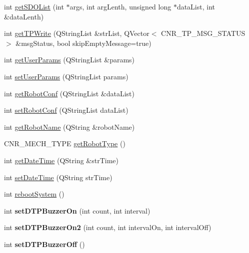 \begin{DoxyCompactItemize}
\item 
int \hyperlink{classCUIApp_af91843d583fe4bd9b12abf1ea1d04bea}{get\-S\-D\-O\-List} (int $\ast$args, int arg\-Lenth, unsigned long $\ast$data\-List, int \&data\-Lenth)
\item 
int \hyperlink{classCUIApp_a9e407fdd117152f6e43e5e6ab5fcb9a6}{get\-T\-P\-Write} (Q\-String\-List \&str\-List, Q\-Vector$<$ C\-N\-R\-\_\-\-T\-P\-\_\-\-M\-S\-G\-\_\-\-S\-T\-A\-T\-U\-S $>$ \&msg\-Status, bool skip\-Empty\-Message=true)
\item 
int \hyperlink{classCUIApp_af65c69d76062c8c0b9eded1761c1e7e9}{get\-User\-Params} (Q\-String\-List \&params)
\item 
int \hyperlink{classCUIApp_a8e509954cca273e527eafc4fde64a0b2}{set\-User\-Params} (Q\-String\-List params)
\item 
int \hyperlink{classCUIApp_a674f263816eeb0bdb7b68439f421260a}{get\-Robot\-Conf} (Q\-String\-List \&data\-List)
\item 
int \hyperlink{classCUIApp_a72fc3d4ed526cc68125ad588f67b5425}{set\-Robot\-Conf} (Q\-String\-List data\-List)
\item 
int \hyperlink{classCUIApp_a9a5718d007c4d0dec21ad234a2827dc2}{get\-Robot\-Name} (Q\-String \&robot\-Name)
\item 
C\-N\-R\-\_\-\-M\-E\-C\-H\-\_\-\-T\-Y\-P\-E \hyperlink{classCUIApp_a33d884ef8a808b2868dbbc47e05e2ac2}{get\-Robot\-Type} ()
\item 
int \hyperlink{classCUIApp_a194fa60ec23503459897381d36f41706}{get\-Date\-Time} (Q\-String \&str\-Time)
\item 
int \hyperlink{classCUIApp_a62cfddfc18a235f0cfc6ea7e168f37ce}{set\-Date\-Time} (Q\-String str\-Time)
\item 
int \hyperlink{classCUIApp_a2ae1abae4dd4aaf40332b127c3fc5b13}{reboot\-System} ()
\item 
\hypertarget{classCUIApp_a9fbc533e92243688559dba348875c7a9}{int {\bfseries set\-D\-T\-P\-Buzzer\-On} (int count, int interval)}\label{classCUIApp_a9fbc533e92243688559dba348875c7a9}

\item 
\hypertarget{classCUIApp_ada7acf7041bfb4156f36ec7a22debc1e}{int {\bfseries set\-D\-T\-P\-Buzzer\-On2} (int count, int interval\-On, int interval\-Off)}\label{classCUIApp_ada7acf7041bfb4156f36ec7a22debc1e}

\item 
\hypertarget{classCUIApp_a3e53f6530373ee13f551c11a2ce43002}{int {\bfseries set\-D\-T\-P\-Buzzer\-Off} ()}\label{classCUIApp_a3e53f6530373ee13f551c11a2ce43002}


\end{DoxyCompactItemize}
